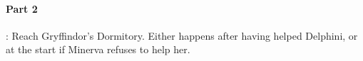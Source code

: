 
\paragraph{Part 2}: Reach Gryffindor's Dormitory. Either happens after having helped Delphini, or at the start if Minerva refuses to help her.


